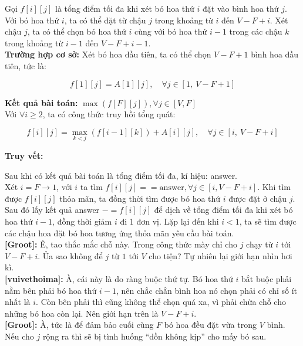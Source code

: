 Gọi $f[i][j]$ là tổng điểm tối đa khi xét bó hoa thứ $i$ đặt vào bình hoa thứ $j$.\\

Với bó hoa thứ $i$, ta có thể đặt từ chậu $j$ trong khoảng từ  $i$ đến $V - F + i$. Xét chậu $j$, ta có thể chọn bó hoa thứ $i$ cùng với bó hoa thứ $i - 1$ trong các chậu $k$ trong khoảng từ $i - 1$ đến $V - F + i - 1$.\\

\textbf{Trường hợp cơ sở:} Xét bó hoa đầu tiên, ta có thể chọn $V - F + 1$ bình hoa đầu tiên, tức là:

\[
f[1][j] = A[1][j], \quad \forall j \in [1,\ V - F + 1]
\]

\textbf{Kết quả bài toán:} $\max \left( f[F][j] \right), \forall j \in [V, F]$\\

Với $\forall i \geq 2$, ta có công thức truy hồi tổng quát:

\[
f[i][j] = \max_{k < j} \left( f[i-1][k] \right) + A[i][j], \quad \forall j \in [i,\ V - F + i]
\]

\textbf{Truy vết:}

Sau khi có kết quả bài toán là tổng điểm tối đa, kí hiệu: answer.\\

Xét $i = F \rightarrow 1$, với $i$ ta tìm $f[i][j] == \text{answer}, \forall j \in [i, V - F + i]$. Khi tìm được $f[i][j]$ thỏa mãn, ta đồng thời tìm được bó hoa thứ $i$ được đặt ở chậu $j$. Sau đó lấy kết quả answer $-= f[i][j]$ để dịch về tổng điểm tối đa khi xét bó hoa thứ $i - 1$, đồng thời giảm $i$ đi 1 đơn vị. Lặp lại đến khi $i < 1$, ta sẽ tìm được các chậu hoa đặt bó hoa tương ứng thỏa mãn yêu cầu bài toán.\\

\textbf{[Groot]:} Ê, tao thắc mắc chỗ này. Trong công thức mày chỉ cho $j$ chạy từ $i$ tới $V - F + i$. 
Ủa sao không để $j$ từ $1$ tới $V$ cho tiện? 
Tự nhiên lại giới hạn nhìn hơi kì.\\

\textbf{[vuivethoima]:} À, cái này là do ràng buộc thứ tự. 
Bó hoa thứ $i$ bắt buộc phải nằm bên phải bó hoa thứ $i-1$, nên chắc chắn bình hoa nó chọn phải có chỉ số ít nhất là $i$.  
Còn bên phải thì cũng không thể chọn quá xa, vì phải chừa chỗ cho những bó hoa còn lại. 
Nên giới hạn trên là $V - F + i$.\\

\textbf{[Groot]:} À, tức là để đảm bảo cuối cùng $F$ bó hoa đều đặt vừa trong $V$ bình. 
Nếu cho $j$ rộng ra thì sẽ bị tình huống ``dồn không kịp'' cho mấy bó sau.\\

